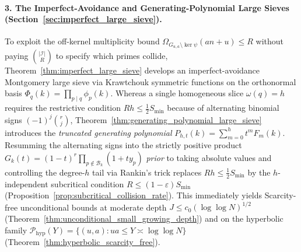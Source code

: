 \documentclass[11pt, a4paper]{article}
\theoremstyle{plain}
\theoremstyle{definition}
\begin{document}
\paragraph{3. The Imperfect-Avoidance and Generating-Polynomial Large Sieves (Section~\ref{sec:imperfect_large_sieve}).}
To exploit the off-kernel multiplicity bound $\Omega_{G_{u,a}\setminus\ker\psi}(an+u)\le R$ without paying $\binom{|\mathcal{I}|}{R}$ to specify which primes collide, Theorem~\ref{thm:imperfect_large_sieve} develops an imperfect-avoidance Montgomery large sieve via Krawtchouk symmetric functions on the orthonormal basis $\Phi_q(k)=\prod_{p\mid q}\phi_p(k)$. Whereas a single homogeneous slice $\omega(q)=h$ requires the restrictive condition $Rh\le\frac12 S_{\min}$ because of alternating binomial signs $(-1)^{j}\binom{r}{j}$, Theorem~\ref{thm:generating_polynomial_large_sieve} introduces the \emph{truncated generating polynomial} $P_{h,t}(k)=\sum_{m=0}^{h}t^{m}F_m(k)$. Resumming the alternating signs into the strictly positive product $G_k(t)=(1-t)^{r}\prod_{p\notin\mathcal{B}_k}(1+ty_p)$ \emph{prior} to taking absolute values and controlling the degree-$h$ tail via Rankin's trick replaces $Rh\le\frac12 S_{\min}$ by the $h$-independent subcritical condition $R\le(1-\varepsilon)S_{\min}$ (Proposition~\ref{prop:subcritical_collision_rate}). This immediately yields Scarcity-free unconditional bounds at moderate depth $J\le c_0(\log\log N)^{1/2}$ (Theorem~\ref{thm:unconditional_small_growing_depth}) and on the hyperbolic family $\mathcal{P}_{\mathrm{hyp}}(Y)=\{(u,a):ua\le Y\asymp\log\log N\}$ (Theorem~\ref{thm:hyperbolic_scarcity_free}).
\end{document}

